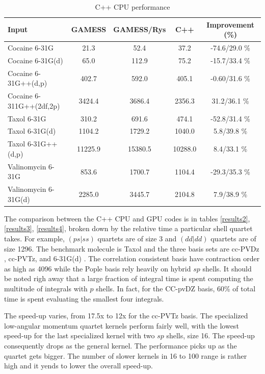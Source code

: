 \documentclass[12pt]{article}
\begin{document}
\begin{table}
  \label{results1}
  \caption {C++ CPU performance}
  \begin{center}
    \begin{tabular}{| l | c | c | c | c |}
      \hline
 Input                    & GAMESS & GAMESS/Rys & C++ & Improvement (\%) \\
 \hline
 Cocaine 6-31G            & 21.3   & 52.4   & 37.2   & -74.6/29.0 \% \\ 
 Cocaine 6-31G(d)         & 65.0   & 112.9  & 75.2   & -15.7/33.4 \% \\ 
 Cocaine 6-31G++(d,p)     & 402.7  & 592.0  & 405.1  & -0.60/31.6 \% \\ 
 Cocaine 6-311G++(2df,2p) & 3424.4 & 3686.4 & 2356.3 &  31.2/36.1 \% \\ 
 \hline
 Taxol 6-31G              & 310.2  & 691.6  & 474.1  &  -52.8/31.4 \% \\
 Taxol 6-31G(d)           & 1104.2 & 1729.2 & 1040.0 &    5.8/39.8 \% \\
 Taxol 6-31G++(d,p)       & 11225.9 & 15380.5 & 10288.0 & 8.4/33.1  \% \\
 \hline
 Valinomycin 6-31G        & 853.6  & 1700.7 & 1104.4 & -29.3/35.3 \% \\ 
 Valinomycin 6-31G(d)     & 2285.0 & 3445.7 & 2104.8 &   7.9/38.9 \% \\
 \hline
    \end{tabular}
  \end{center}
\end{table}

The comparison between the C++ CPU and GPU codes is in tables
\ref{results2}, \ref{results3}, \ref{results4}, broken down by the
relative time a particular shell quartet takes.  For example,
$(ps|ss)$ quartets are of size 3 and $(dd|dd)$ quartets are of size
1296. The benchmark molecule is Taxol and the three basis sets are
cc-PVDz , cc-PVTz, and 6-31G(d) \cite{davidson_basis_1986}.
  The correlation consistent basis have contraction order
as high as 4096 while the Pople basis rely heavily on hybrid $sp$
shells.  It should be noted righ away that a large fraction of
integral time is spent computing the multitude of integrals with $p$
shells.  In fact, for the CC-pvDZ basis, 60\% of total time is spent
evaluating the smallest four integrals.

The speed-up varies, from 17.5x to 12x for the cc-PVTz basis.
The specialized low-angular momentum quartet kernels perform fairly
well, with the lowest speed-up for the last specialized kernel with
two $sp$ shells, size 16.  The speed-up consequently drops as the
general kernel.  The performance picks up as the quartet gets bigger.
The number of slower kernels in 16 to 100 range is rather high and it
yends to lower the overall speed-up.   
\end{document}
